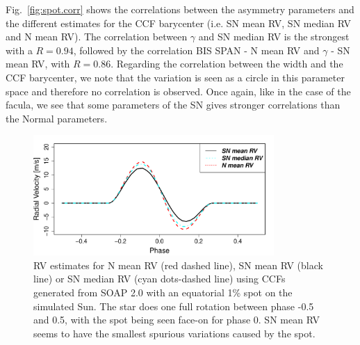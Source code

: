 \documentclass{aa}
\begin{document}
Fig.~\ref{fig:spot.corr} shows the correlations between the asymmetry parameters and the different estimates for the CCF barycenter (i.e. SN mean RV, SN median RV and N mean RV). The correlation between $\gamma$ and SN median RV is the strongest with a $R=0.94$, followed by the correlation BIS SPAN - N mean RV and $\gamma$ - SN mean RV, with $R=0.86$. Regarding the correlation between the width and the CCF barycenter, we note that the variation is seen as a circle in this parameter space and therefore no correlation is observed. Once again, like in the case of the facula, we see that some parameters of the SN gives stronger correlations than the Normal parameters.

\begin{figure}[htbp]
\begin{center}
\includegraphics[width=3.6in]{RV_comparison_SPOT.pdf} 
\caption{RV estimates for N mean RV (red dashed line),  SN mean RV (black line) or SN median RV (cyan dots-dashed line) using CCFs generated from SOAP 2.0 with an equatorial 1\% spot on the simulated Sun. The star does one full rotation between phase -0.5 and 0.5, with the spot being seen face-on for phase 0. SN mean RV seems to have the smallest spurious variations caused by the spot.}
    \label{fig:spot}
\end{center}
\end{figure}
\end{document}

